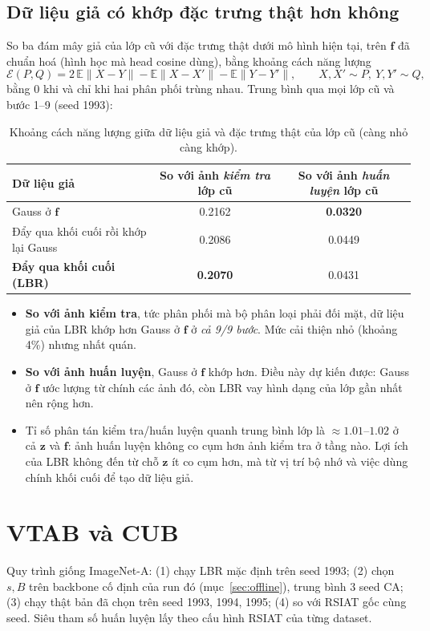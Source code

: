 \documentclass[11pt]{article}
\newcommand{\vf}{\mathbf{f}}
\newcommand{\vz}{\mathbf{z}}
\begin{document}
\subsection{Dữ liệu giả có khớp đặc trưng thật hơn không}\label{sec:fid}
So ba đám mây giả của lớp cũ với đặc trưng thật dưới mô hình hiện tại, trên $\vf$ đã chuẩn hoá (hình học mà head cosine
dùng), bằng khoảng cách năng lượng \cite{energy}
\[
\mathcal E(P,Q)=2\,\mathbb E\|X-Y\|-\mathbb E\|X-X'\|-\mathbb E\|Y-Y'\|,\qquad X,X'\sim P,\ Y,Y'\sim Q,
\]
bằng 0 khi và chỉ khi hai phân phối trùng nhau. Trung bình qua mọi lớp cũ và bước 1--9 (seed 1993):
\begin{table}[H]
\centering\small
\caption{Khoảng cách năng lượng giữa dữ liệu giả và đặc trưng thật của lớp cũ (càng nhỏ càng khớp).}
\label{tab:fid}
\begin{tabular}{lcc}
\toprule
Dữ liệu giả & So với ảnh \emph{kiểm tra} lớp cũ & So với ảnh \emph{huấn luyện} lớp cũ\\
\midrule
Gauss ở $\vf$ & 0.2162 & \textbf{0.0320}\\
Đẩy qua khối cuối rồi khớp lại Gauss & 0.2086 & 0.0449\\
\textbf{Đẩy qua khối cuối (LBR)} & \textbf{0.2070} & 0.0431\\
\bottomrule
\end{tabular}
\end{table}
\begin{itemize}
\item \textbf{So với ảnh kiểm tra}, tức phân phối mà bộ phân loại phải đối mặt, dữ liệu giả của LBR khớp hơn Gauss ở
      $\vf$ ở \emph{cả 9/9 bước}. Mức cải thiện nhỏ (khoảng 4\%) nhưng nhất quán.
\item \textbf{So với ảnh huấn luyện}, Gauss ở $\vf$ khớp hơn. Điều này dự kiến được: Gauss ở $\vf$ ước lượng từ chính
      các ảnh đó, còn LBR vay hình dạng của lớp gần nhất nên rộng hơn.
\item Tỉ số phân tán kiểm tra/huấn luyện quanh trung bình lớp là $\approx1.01$--$1.02$ ở cả $\vz$ và $\vf$: ảnh huấn
      luyện không co cụm hơn ảnh kiểm tra ở tầng nào. Lợi ích của LBR không đến từ chỗ $\vz$ ít co cụm hơn, mà từ vị trí
      bộ nhớ và việc dùng chính khối cuối để tạo dữ liệu giả.
\end{itemize}

\section{VTAB và CUB}\label{sec:more}
Quy trình giống ImageNet-A: (1) chạy LBR mặc định trên seed 1993; (2) chọn $s,B$ trên backbone cố định của run đó
(mục~\ref{sec:offline}), trung bình 3 seed CA; (3) chạy thật bản đã chọn trên seed 1993, 1994, 1995; (4) so với RSIAT
gốc cùng seed. Siêu tham số huấn luyện lấy theo cấu hình RSIAT của từng dataset.
\end{document}
